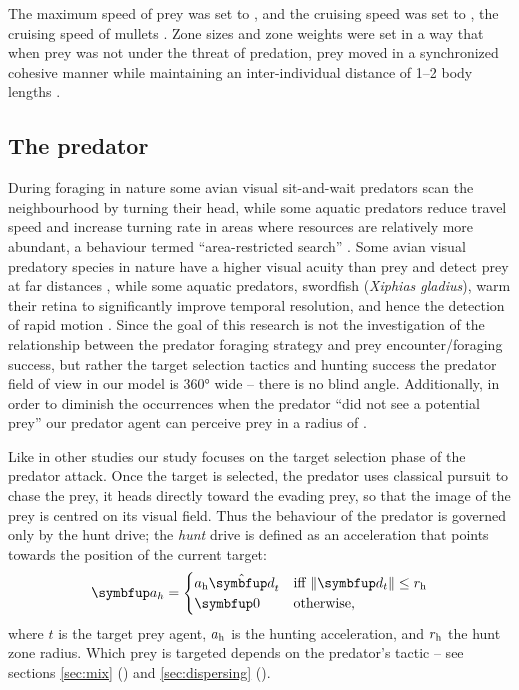 The maximum speed of prey was set to , and the cruising speed was set to , the cruising speed of mullets \cite{videler1993fish}. Zone sizes and zone weights were set in a way that when prey was not under the threat of predation, prey moved in a synchronized cohesive manner while maintaining an inter-individual distance of 1--2 body lengths \cite{johansen2010kinematics,killen2011aerobic}.

\subsection{The predator}

During foraging in nature some avian visual sit-and-wait predators \cite{gall2010visual,orourke2010hawkeyes2} scan the neighbourhood by turning their head, while some aquatic predators reduce travel speed and increase turning rate in areas where resources are relatively more abundant, a behaviour termed ``area-restricted search'' \cite{thums2011insitu}. Some avian visual predatory species in nature have a higher visual acuity than prey and detect prey at far distances \cite{andersson2009predator}, while some aquatic predators, \eg swordfish (\emph{Xiphias gladius}), warm their retina to significantly improve temporal resolution, and hence the detection of rapid motion \cite{fritsches2005warm}. Since the goal of this research is not the investigation of the relationship between the predator foraging strategy and prey encounter/foraging success, but rather the target selection tactics and hunting success the predator field of view in our model is \ang{360} wide -- there is no blind angle. Additionally, in order to diminish the occurrences when the predator ``did not see a potential prey'' our predator agent can perceive prey in a radius of .

Like in other studies \cite{demsar2014simulated,kunz2006prey,nishimura2002predator,olson2013predator} our study focuses on the target selection phase of the predator attack. Once the target is selected, the predator uses classical pursuit \cite{nahin2012chases} to chase the prey, \ie it heads directly toward the evading prey, so that the image of the prey is centred on its visual field. Thus the behaviour of the predator is governed only by the hunt drive; the \emph{hunt} drive is defined as an acceleration that points towards the position of the current target:
%
\begin{equation}
  \vec{a}_h = \begin{cases}
    a_\textnormal{h} \uvec{d}_t & \textnormal{iff}\ \|\vec{d}_t\| \leq r_\textnormal{h} \\
    \vec{0} & \textnormal{otherwise,}
  \end{cases}
\end{equation}
%
where $t$ is the target prey agent, $a_\textnormal{h}$ is the hunting acceleration, and $r_\textnormal{h}$ the hunt zone radius. Which prey is targeted depends on the predator's tactic -- see sections \ref{sec:mix} () and \ref{sec:dispersing} ().

